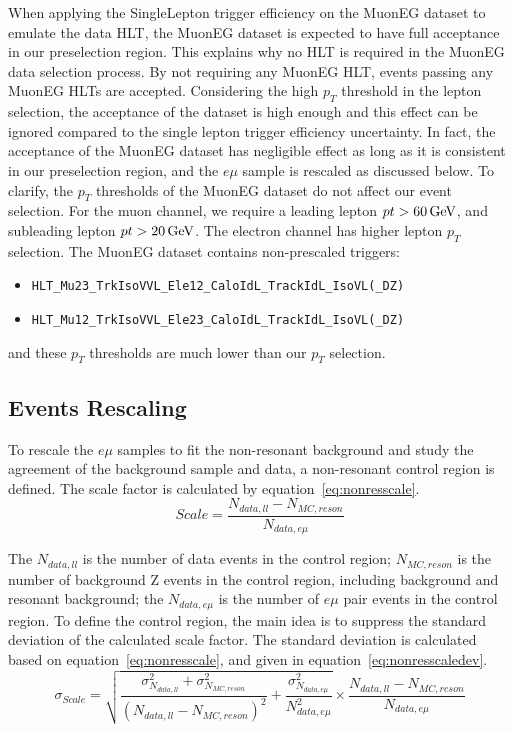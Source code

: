 \vspace{0.3cm}
When applying the SingleLepton trigger efficiency on the MuonEG dataset to emulate the data HLT, the MuonEG dataset is expected to have full acceptance in our preselection region. This explains why no HLT is required in the MuonEG data selection process. By not requiring any MuonEG HLT, events passing any MuonEG HLTs are accepted. Considering the high $p_T$ threshold in the lepton selection, the acceptance of the dataset is high enough and this effect can be ignored compared to the single lepton trigger efficiency uncertainty. In fact, the acceptance of the MuonEG dataset has negligible effect as long as it is consistent in our preselection region, and the $e\mu$ sample is rescaled as discussed below. To clarify, the $p_T$ thresholds of the MuonEG dataset do not affect our event selection. For the muon channel, we require a leading lepton $pt>60\,\text{Ge\hspace{-.08em}V}$, and subleading lepton $pt>20\,\text{Ge\hspace{-.08em}V}$. The electron channel has higher lepton $p_T$ selection. The MuonEG dataset contains non-prescaled triggers:
\begin{itemize}
\item \texttt{HLT\_Mu23\_TrkIsoVVL\_Ele12\_CaloIdL\_TrackIdL\_IsoVL(\_DZ)} 
\item \texttt{HLT\_Mu12\_TrkIsoVVL\_Ele23\_CaloIdL\_TrackIdL\_IsoVL(\_DZ)}
\end{itemize}
and these $p_T$ thresholds are much lower than our $p_T$ selection.

\subsection{ Events Rescaling}
To rescale the $e\mu$ samples to fit the non-resonant background and study the agreement of the background sample and data, a non-resonant control region is defined. The scale factor is calculated by equation~\ref{eq:nonresscale}.
\begin{equation} \label{eq:nonresscale}
  Scale  =  \frac{N_{data,ll}-N_{MC,reson}}{N_{data,e\mu}}
\end{equation}

The $N_{data,ll}$ is the number of data events in the control region; $N_{MC,reson}$ is the number of background Z events in the control region, including \Zjets background and resonant background; the $N_{data,e\mu}$ is the number of $e\mu$ pair events in the control region. To define the control region, the main idea is to suppress the standard deviation of the calculated scale factor. The standard deviation is calculated based on equation~\ref{eq:nonresscale}, and given in equation~\ref{eq:nonresscaledev}.
\begin{equation} \label{eq:nonresscaledev}
  \sigma_{Scale}  = \sqrt{\frac{\sigma^{2}_{N_{data,ll}}+\sigma^{2}_{N_{MC,reson}}}{(N_{data,ll}-N_{MC,reson})^{2}}+\frac{\sigma^{2}_{N_{data,e\mu}}}{N^{2}_{data,e\mu}}}\times \frac{N_{data,ll}-N_{MC,reson}}{N_{data,e\mu}}
\end{equation}

